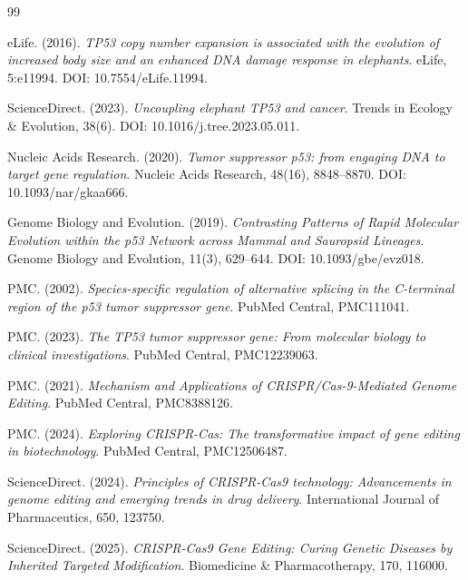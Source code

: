 \documentclass[11pt,a4paper]{article}
\begin{document}
\begin{thebibliography}{99}

eLife. (2016).
\textit{TP53 copy number expansion is associated with the evolution of increased body size and an enhanced DNA damage response in elephants}.
eLife, 5:e11994. DOI: 10.7554/eLife.11994.

ScienceDirect. (2023).
\textit{Uncoupling elephant TP53 and cancer}.
Trends in Ecology \& Evolution, 38(6). DOI: 10.1016/j.tree.2023.05.011.

Nucleic Acids Research. (2020).
\textit{Tumor suppressor p53: from engaging DNA to target gene regulation}.
Nucleic Acids Research, 48(16), 8848--8870. DOI: 10.1093/nar/gkaa666.

Genome Biology and Evolution. (2019).
\textit{Contrasting Patterns of Rapid Molecular Evolution within the p53 Network across Mammal and Sauropsid Lineages}.
Genome Biology and Evolution, 11(3), 629--644. DOI: 10.1093/gbe/evz018.

PMC. (2002).
\textit{Species-specific regulation of alternative splicing in the C-terminal region of the p53 tumor suppressor gene}.
PubMed Central, PMC111041.

PMC. (2023).
\textit{The TP53 tumor suppressor gene: From molecular biology to clinical investigations}.
PubMed Central, PMC12239063.

PMC. (2021).
\textit{Mechanism and Applications of CRISPR/Cas-9-Mediated Genome Editing}.
PubMed Central, PMC8388126.

PMC. (2024).
\textit{Exploring CRISPR-Cas: The transformative impact of gene editing in biotechnology}.
PubMed Central, PMC12506487.

ScienceDirect. (2024).
\textit{Principles of CRISPR-Cas9 technology: Advancements in genome editing and emerging trends in drug delivery}.
International Journal of Pharmaceutics, 650, 123750.

ScienceDirect. (2025).
\textit{CRISPR-Cas9 Gene Editing: Curing Genetic Diseases by Inherited Targeted Modification}.
Biomedicine \& Pharmacotherapy, 170, 116000.

\end{thebibliography}
\end{document}
